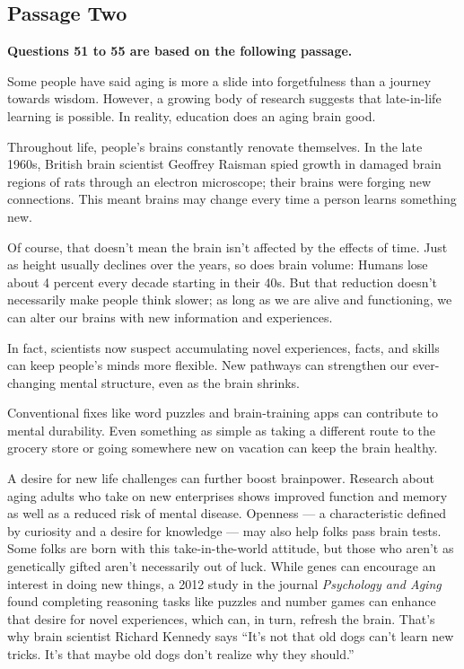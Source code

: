 \documentclass[UTF8,11pt]{ctexart}
\begin{document}
\subsection*{\textbf{Passage Two}}


\textbf{Questions 51 to 55 are based on the following passage.}


Some people have said aging is more a slide into forgetfulness than a journey towards wisdom. However, a growing body of research suggests that late-in-life learning is possible. In reality, education does an aging brain good.


Throughout life, people’s brains constantly renovate themselves. In the late 1960s, British brain scientist Geoffrey Raisman spied growth in damaged brain regions of rats through an electron microscope; their brains were forging new connections. This meant brains may change every time a person learns something new.


Of course, that doesn’t mean the brain isn’t affected by the effects of time. Just as height usually declines over the years, so does brain volume: Humans lose about 4 percent every decade starting in their 40s. But that reduction doesn’t necessarily make people think slower; as long as we are alive and functioning, we can alter our brains with new information and experiences.


In fact, scientists now suspect accumulating novel experiences, facts, and skills can keep people’s minds more flexible. New pathways can strengthen our ever-changing mental structure, even as the brain shrinks.


Conventional fixes like word puzzles and brain-training apps can contribute to mental durability. Even something as simple as taking a different route to the grocery store or going somewhere new on vacation can keep the brain healthy.


A desire for new life challenges can further boost brainpower. Research about aging adults who take on new enterprises shows improved function and memory as well as a reduced risk of mental disease. Openness — a characteristic defined by curiosity and a desire for knowledge — may also help folks pass brain tests. Some folks are born with this take-in-the-world attitude, but those who aren’t as genetically gifted aren’t necessarily out of luck. While genes can encourage an interest in doing new things, a 2012 study in the journal \textit{Psychology and Aging} found completing reasoning tasks like puzzles and number games can enhance that desire for novel experiences, which can, in turn, refresh the brain. That’s why brain scientist Richard Kennedy says “It’s not that old dogs can’t learn new tricks. It’s that maybe old dogs don’t realize why they should.”
\end{document}
